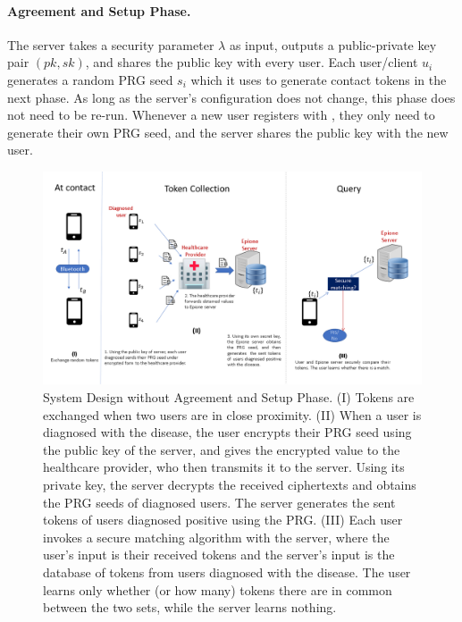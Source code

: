 \paragraph{Agreement and Setup Phase.}  



The \dect server takes a security parameter $\lambda$ as input, outputs a public-private key pair $(pk, sk)$, and shares the public key with every user. Each user/client $u_i$ generates a random PRG seed $s_i$ which it uses to generate contact tokens in the next phase. 
As long as the server's configuration does not change, this phase does not need to be re-run. Whenever a new user registers with \dect, they only need to generate their own PRG seed, and the server shares the public key with the new user. 


\begin{figure}[t]
	\centering
	\includegraphics[scale=0.51,bb= 0 0 960 540]{figs/system.png}
	\caption{\dect System Design without Agreement and Setup Phase. (I) Tokens are exchanged when two users are in close proximity. (II) When a user is diagnosed with the disease, the user encrypts their PRG seed using the public key of the \dect server, and gives the encrypted value to the healthcare provider, who then transmits it to the \dect server. Using its private key, the \dect server decrypts the received ciphertexts and obtains the PRG seeds of diagnosed users. The \dect server generates the sent tokens of users diagnosed positive using the PRG. (III) Each user invokes a secure matching algorithm with the \dect server, where the user's input is their received tokens and the server's input is the database of tokens from users diagnosed with the disease. The user learns only whether (or how many) tokens there are in common between the two sets, while the \dect server learns nothing.
	}
	\label{fig:system}
\end{figure} %

